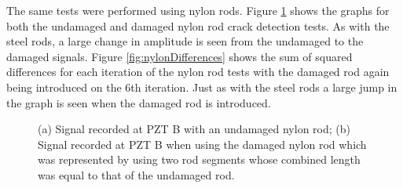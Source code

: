The same tests were performed using nylon rods. Figure \ref{fig:nylonCrackResults} shows the graphs for both the undamaged and damaged nylon rod crack detection tests. As with the steel rods, a large change in amplitude is seen from the undamaged to the damaged signals. Figure \ref{fig:nylonDifferences} shows the sum of squared differences for each iteration of the nylon rod tests with the damaged rod again being introduced on the 6th iteration. Just as with the steel rods a large jump in the graph is seen when the damaged rod is introduced.

\begin{figure}
\begin{subfigmatrix}{2}
\end{subfigmatrix}

  \caption[all]
  { \label{fig:nylonCrackResults}
(a) Signal recorded at PZT B with an undamaged nylon rod;
(b) Signal recorded at PZT B when using the damaged nylon rod which was represented by using two rod segments whose combined length was equal to that of the undamaged rod.
}
\end{figure}

